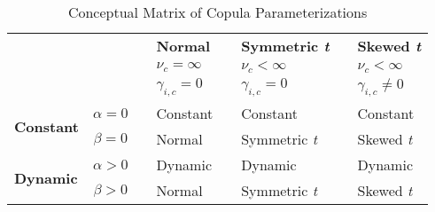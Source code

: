 
\begin{table}
  \centering
  \footnotesize
  \renewcommand{\arraystretch}{1.2}

  \caption{Conceptual Matrix of Copula Parameterizations}

  \begin{tabularx}{0.80\textwidth}{@{} lc c >{\centering}Xc >{\centering}Xc >{\centering\arraybackslash}X}
    \toprule
      & && \textbf{Normal} && \textbf{Symmetric \emph{t}} && \textbf{Skewed \emph{t}} \\
      \cmidrule{4-4}
      \cmidrule{6-6}
      \cmidrule{8-8}
      & && $\nu_c = \infty$   && $\nu_c < \infty$   && $\nu_c < \infty$ \\
      & && $\gamma_{i,c} = 0$ && $\gamma_{i,c} = 0$ && $\gamma_{i,c} \neq 0$ \\
      \cmidrule{4-8}
    \cmidrule{1-2}
    \multirow{2}{*}{\textbf{Constant}} & $\alpha = 0$ && Constant && Constant && Constant \\
                              & $\beta = 0$  && Normal   && Symmetric \emph{t} && Skewed \emph{t}      \\
    \cmidrule{1-2}
    \multirow{2}{*}{\textbf{Dynamic}}  & $\alpha > 0$ && Dynamic  && Dynamic && Dynamic \\
                              & $\beta > 0$  && Normal   && Symmetric \emph{t} && Skewed \emph{t}      \\
    \bottomrule
  \end{tabularx}

\end{table}
